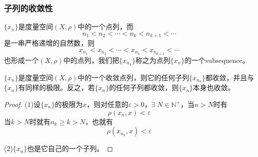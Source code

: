 \subsubsection{子列的收敛性}
\begin{definition}
	$\{x_n\}$是度量空间$(X,\rho)$中的一个点列，而
	\begin{equation*}
		n_1<n_2<\cdots<n_k<n_{k+1}<\cdots
	\end{equation*}
	是一串严格递增的自然数，则
	\begin{equation*}
		x_{n_1}<x_{n_2}<\cdots<x_{n_k}<x_{n_{k+1}}<\cdots
	\end{equation*}
	也形成一个$(X,\rho)$中的点列，我们把$\{x_{n_k}\}$称之为点列$\{x_n\}$的一个\gls{subsequence}。
\end{definition}
\begin{theorem}
	$\{x_n\}$是度量空间$(X,\rho)$中的一个收敛点列，则它的任何子列$\{x_{n_k}\}$都收敛，并且与$\{x_n\}$有同样的极限。反之，若$\{x_n\}$的任何子列都收敛，则$\{x_n\}$本身也收敛。
\end{theorem}
\begin{proof}
	(1)设$\{x_n\}$的极限为$x$，则对任意的$\varepsilon>0$，$\exists\; N\in\mathbb{N}^+$，当$n>N$时有
	\begin{equation*}
		\rho(x_n,x)<\varepsilon
	\end{equation*}
	当$k>N$时就有$n_k\geqslant k>N$，也就有
	\begin{equation*}
		\rho(x_{n_k},x)<\varepsilon
	\end{equation*}\par
	(2)$\{x_n\}$也是它自己的一个子列。
\end{proof}